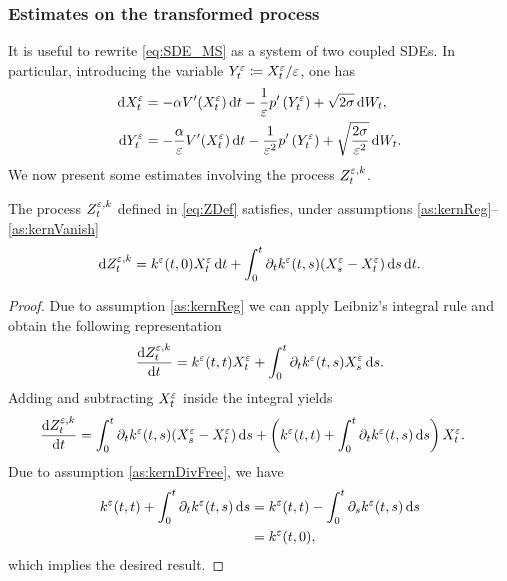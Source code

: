 \documentclass[10pt]{article}
\begin{document}
\subsubsection{Estimates on the transformed process}

It is useful to rewrite \eqref{eq:SDE_MS} as a system of two coupled SDEs. In particular, introducing the variable $Y^\varepsilon_t \coloneqq X^\varepsilon_t / \varepsilon$, one has
\begin{equation}\label{eq:SDE_MS2}
\begin{aligned}
	\mathrm{d} X_t^\varepsilon &= -\alpha V'(X_t^\varepsilon) \,\mathrm{d} t - \frac1{\varepsilon} p'\left(Y_t^\varepsilon\right) + \sqrt{2\sigma} \,\mathrm{d} W_t, \\
	\mathrm{d} Y_t^\varepsilon &= -\frac{\alpha}{\varepsilon} V'(X_t^\varepsilon) \,\mathrm{d} t - \frac1{\varepsilon^2} p'\left(Y^\varepsilon_t\right) + \sqrt{\frac{2\sigma}{\varepsilon^2}} \,\mathrm{d} W_t.
\end{aligned}
\end{equation}
We now present some estimates involving the process $Z_t^{\varepsilon, k}$.
\begin{lemma}\label{lem:ZRewriting} The process $Z_t^{\varepsilon, k}$ defined in \eqref{eq:ZDef} satisfies, under assumptions \ref{as:kernReg}--\ref{as:kernVanish}
	\begin{equation}
	\mathrm{d} Z_t^{\varepsilon, k} = k^\varepsilon(t, 0) X^\varepsilon_t \,\mathrm{d} t + \int_0^t \partial_t k^\varepsilon(t, s) (X^\varepsilon_s - X^\varepsilon_t) \,\mathrm{d} s \,\mathrm{d} t.
	\end{equation}
\end{lemma}
\begin{proof} Due to assumption \ref{as:kernReg} we can apply Leibniz's integral rule and obtain the following representation
	\begin{equation}
	\frac{\mathrm{d} Z^{\varepsilon,k}_t}{\mathrm{d} t} = k^\varepsilon(t, t)X^\varepsilon_t + \int_0^t \partial_t k^\varepsilon(t, s) X^\varepsilon_s \,\mathrm{d} s.
	\end{equation}
	Adding and subtracting $X_t^\varepsilon$ inside the integral yields
	\begin{equation}
	\begin{aligned}
	\frac{\mathrm{d} Z^{\varepsilon,k}_t}{\mathrm{d} t} &= \int_0^t \partial_t k^\varepsilon(t, s) (X^\varepsilon_s - X^\varepsilon_t) \,\mathrm{d} s + \left(k^\varepsilon(t, t) + \int_0^t \partial_t k^\varepsilon(t, s) \,\mathrm{d} s\right)X^\varepsilon_t.
	\end{aligned}
	\end{equation}
	Due to assumption \ref{as:kernDivFree}, we have
	\begin{equation}
	\begin{aligned}
	k^\varepsilon(t, t) + \int_0^t \partial_t k^\varepsilon(t, s) \,\mathrm{d} s &= k^\varepsilon(t, t) - \int_0^t \partial_s k^\varepsilon(t, s) \,\mathrm{d} s\\
	&= k^\varepsilon(t, 0),
	\end{aligned}
	\end{equation}
	which implies the desired result.
\end{proof}
\end{document}
